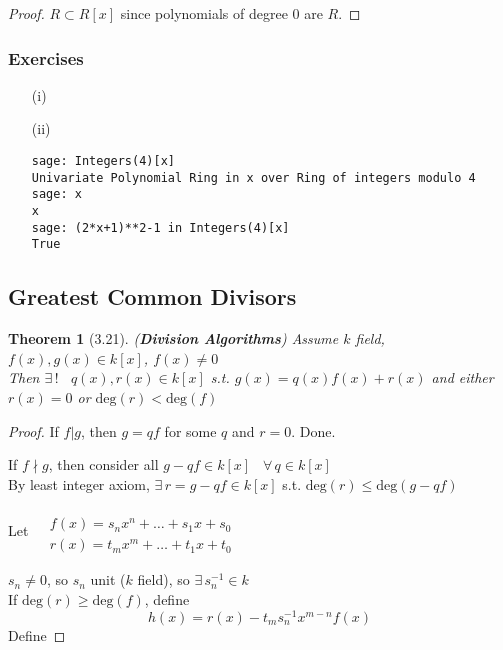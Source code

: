 \documentclass[twoside,landscape]{amsart}
\theoremstyle{plain}
\newtheorem{theorem}{Theorem}
\theoremstyle{definition}
\theoremstyle{remark}
\newcommand{\exercisehead}[1]
  { \smallskip
   \noindent{\small\bf Exercise #1.}
  }
\begin{document}
\begin{multicols*}{2}
\begin{proof}
$R \subset R[x]$ since polynomials of degree $0$ are $R$.  


\end{proof}

\subsubsection*{Exercises}

\exercisehead{3.21}

\begin{enumerate}
\item[(i)]
\item[(ii)] 
\begin{lstlisting}
sage: Integers(4)[x]
Univariate Polynomial Ring in x over Ring of integers modulo 4
sage: x
x
sage: (2*x+1)**2-1 in Integers(4)[x]
True
\end{lstlisting}
\end{enumerate}


\subsection{ Greatest Common Divisors }

\begin{theorem}[3.21] (\textbf{Division Algorithms})
  Assume $k$ field, $f(x),g(x) \in k[x]$, $f(x)\neq 0$ \\
Then $\exists \, !$ \, $q(x),r(x) \in k[x]$ s.t. $g(x) = q(x)f(x) + r(x)$ and either $r(x)=0$ or $\text{deg}(r) < \text{deg}(f)$
\end{theorem}

\begin{proof}
If $f | g$, then $g=qf$ for some $q$ and $r=0$.  Done.  

If $f \nmid g$, then consider all $g-qf \in k[x]$ \, $\forall \, q \in k[x]$ \\
By least integer axiom, $\exists \, r = g -qf \in k[x]$ s.t. $\text{deg}(r) \leq \text{deg}(g-qf)$

Let $\begin{aligned} & \quad \\
  & f(x) = s_n x^n + \dots + s_1x + s_0 \\
  & r(x) = t_m x^m + \dots + t_1x + t_0 \end{aligned}$

$s_n \neq 0 $, so $s_n$ unit ($k$ field), so $\exists \, s_n^{-1} \in k$ \\
If $\text{deg}(r) \geq \text{deg}(f)$, define
\[
h(x) = r(x) - t_ms_n^{-1}x^{m-n}f(x)
\]
Define


\end{proof}
\end{multicols*}
\end{document}
